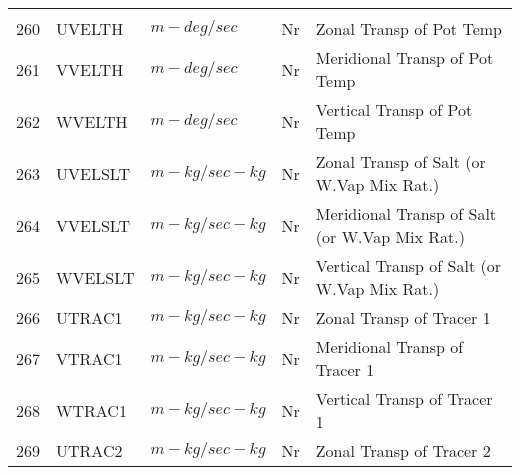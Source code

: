 \begin{tabular}{lllll}
\begin{minipage}[t]{3in}
         \end{minipage}\\
260& UVELTH   & $m-deg/sec$ & Nr
         &\begin{minipage}[t]{3in}
          {Zonal Transp of Pot Temp} 
         \end{minipage}\\
261& VVELTH   & $m-deg/sec$ & Nr
         &\begin{minipage}[t]{3in}
          {Meridional Transp of Pot Temp} 
         \end{minipage}\\
262& WVELTH   & $m-deg/sec$ & Nr
         &\begin{minipage}[t]{3in}
          {Vertical Transp of Pot Temp} 
         \end{minipage}\\
263& UVELSLT  & $m-kg/sec-kg$ & Nr
         &\begin{minipage}[t]{3in}
          {Zonal Transp of Salt (or W.Vap Mix Rat.)} 
         \end{minipage}\\
264& VVELSLT  & $m-kg/sec-kg$ & Nr
         &\begin{minipage}[t]{3in}
          {Meridional Transp of Salt (or W.Vap Mix Rat.)} 
         \end{minipage}\\
265& WVELSLT  & $m-kg/sec-kg$ & Nr
         &\begin{minipage}[t]{3in}
          {Vertical Transp of Salt (or W.Vap Mix Rat.)} 
         \end{minipage}\\
266& UTRAC1   & $m-kg/sec-kg$ & Nr
         &\begin{minipage}[t]{3in}
          {Zonal Transp of Tracer 1} 
         \end{minipage}\\
267& VTRAC1   & $m-kg/sec-kg$ & Nr
         &\begin{minipage}[t]{3in}
          {Meridional Transp of Tracer 1} 
         \end{minipage}\\
268& WTRAC1   & $m-kg/sec-kg$ & Nr
         &\begin{minipage}[t]{3in}
          {Vertical Transp of Tracer 1} 
         \end{minipage}\\
269& UTRAC2   & $m-kg/sec-kg$ & Nr
         &\begin{minipage}[t]{3in}
          {Zonal Transp of Tracer 2} 

\end{minipage}
\end{tabular}
